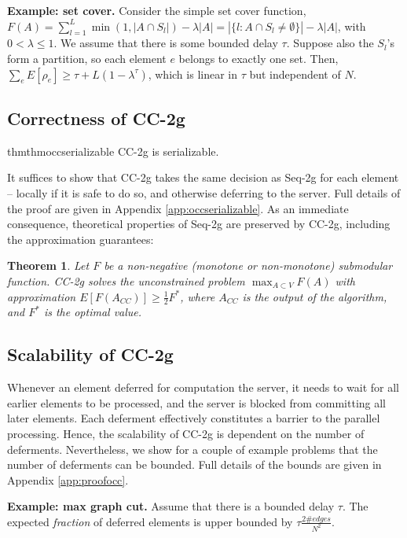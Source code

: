 \documentclass{article} %
\newcommand{\occ}{CC-2g}
\newcommand{\seqalg}{Seq-2g}
\newcommand{\occshort}{CC}
\newtheorem{thm}{Theorem}[section]
\begin{document}
\textbf{Example: set cover.}
Consider the simple set cover function,
$F(A) = \sum_{l=1}^L \min(1,|A\cap S_l|) - \lambda|A| = |\{l: A\cap S_l \neq\emptyset\}| - \lambda|A|$,
with $0 < \lambda \leq 1$.
We assume that there is some bounded delay $\tau$.
Suppose also the $S_l$'s form a partition, so each element $e$ belongs to exactly one set.
Then, $\sum_e E[\rho_e] \geq \tau + L(1-\lambda^\tau)$, which is linear in $\tau$ but independent of $N$.



\subsection{Correctness of \occ{}}
\begin{restatable}{thm}{thmoccserializable} \occ{} is serializable.
\end{restatable}
It suffices to show that \occ{} takes the same decision as \seqalg{} for each element -- locally if it is safe to do so, and otherwise deferring to the server.
Full details of the proof are given in Appendix \ref{app:occserializable}.
As an immediate consequence, theoretical properties of \seqalg{} are preserved by \occ{}, including the approximation guarantees:

\begin{thm} Let $F$ be a non-negative (monotone or non-monotone) submodular function.
\occ{} solves the unconstrained problem $\max_{A\subset V} F(A)$ with approximation
$E[F(A_{\occshort{}})] \geq \frac{1}{2}F^*$,
where $A_{\occshort{}}$ is the output of the algorithm, and $F^*$ is the optimal value.
\end{thm}




\subsection{Scalability of \occ{}}
Whenever an element deferred for computation the server, it needs to wait for all earlier elements to be processed, and the server is blocked from committing all later elements.
Each deferment effectively constitutes a barrier to the parallel processing.
Hence, the scalability of \occ{} is dependent on the number of deferments.
Nevertheless, we show for a couple of example problems that the number of deferments can be bounded.
Full details of the bounds are given in Appendix \ref{app:proofocc}.

\textbf{Example: max graph cut.}
Assume that there is a bounded delay $\tau$.
The expected \emph{fraction} of deferred elements is upper bounded by $\tau \frac{2\#edges}{N^2}$.
\end{document}
